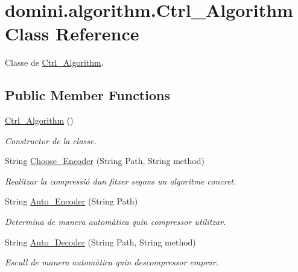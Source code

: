 \hypertarget{classdomini_1_1algorithm_1_1Ctrl__Algorithm}{}\section{domini.\+algorithm.\+Ctrl\+\_\+\+Algorithm Class Reference}
\label{classdomini_1_1algorithm_1_1Ctrl__Algorithm}


Classe de \hyperlink{classdomini_1_1algorithm_1_1Ctrl__Algorithm}{Ctrl\+\_\+\+Algorithm}.  


\subsection*{Public Member Functions}
\begin{DoxyCompactItemize}
\item 
\hyperlink{classdomini_1_1algorithm_1_1Ctrl__Algorithm_aa625781819b57512a3e42df15a3b2ffb}{Ctrl\+\_\+\+Algorithm} ()
\begin{DoxyCompactList}\small\item\em Constructor de la classe. \end{DoxyCompactList}\item 
String \hyperlink{classdomini_1_1algorithm_1_1Ctrl__Algorithm_a5af3b3afa4465c95093532396cecb8c7}{Choose\+\_\+\+Encoder} (String Path, String method)
\begin{DoxyCompactList}\small\item\em Realitzar la compressió d\textquotesingle{}un fitxer segons un algoritme concret. \end{DoxyCompactList}\item 
String \hyperlink{classdomini_1_1algorithm_1_1Ctrl__Algorithm_a6f7a706e07d4e6f8c1ea293d06e17318}{Auto\+\_\+\+Encoder} (String Path)
\begin{DoxyCompactList}\small\item\em Determina de manera automàtica quin compressor utilitzar. \end{DoxyCompactList}\item 
String \hyperlink{classdomini_1_1algorithm_1_1Ctrl__Algorithm_a613d15cc5326fc688b11d2c71ec9500a}{Auto\+\_\+\+Decoder} (String Path, String method)
\begin{DoxyCompactList}\small\item\em Escull de manera automàtica quin descompressor emprar. \end{DoxyCompactList}\end{DoxyCompactItemize}


